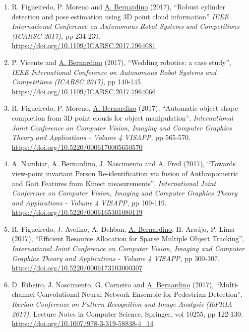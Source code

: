 \documentclass[
]{article}
\begin{document}
\begin{enumerate}
  C. Cardoso and \ul{A. Bernardino} (2017), ``Adaptive Non-Maximal
  Suppression Filtering for Online Exploration Learning with
  Cost-Regularized Kernel Regression'', \emph{IEEE International
  Conference on Autonomous Robot Systems and Competitions (ICARSC
  2017),} pp 272-277\emph{.}
  \url{https://doi.org/10.1109/ICARSC.2017.7964087}~
\item
  R. Figueiredo, P. Moreno and \ul{A. Bernardino} (2017), ``Robust
  cylinder detection and pose estimation using 3D point cloud
  information'' \emph{IEEE International Conference on Autonomous Robot
  Systems and Competitions (ICARSC 2017),} pp 234-239\emph{.}
  \url{https://doi.org/10.1109/ICARSC.2017.7964081}~
\item
  P. Vicente and \ul{A. Bernardino} (2017), ``Wedding robotics: a case
  study'', \emph{IEEE International Conference on Autonomous Robot
  Systems and Competitions (ICARSC 2017),} pp 140-145\emph{.}
  \url{https://doi.org/10.1109/ICARSC.2017.7964066}~
\item
  R. Figueiredo, P. Moreno, \ul{A. Bernardino} (2017), ``Automatic
  object shape completion from 3D point clouds for object
  manipulation'', \emph{International Joint Conference on Computer
  Vision, Imaging and Computer Graphics Theory and Applications - Volume
  4 VISAPP,} pp 565-570. \url{https://doi.org/10.5220/0006170005650570}~
\item
  A. Nambiar, \ul{A. Bernardino}, J. Nascimento and A. Fred (2017),
  ``Towards view-point invariant Person Re-identification via fusion of
  Anthropometric and Gait Features from Kinect measurements'',
  \emph{International Joint Conference on Computer Vision, Imaging and
  Computer Graphics Theory and Applications - Volume 4 VISAPP}, pp
  109-119. \url{https://doi.org/10.5220/0006165301080119}~
\item
  R. Figueiredo, J. Avelino, A. Dehban, \ul{A. Bernardino}, H. Araújo,
  P. Lima (2017), ``Efficient Resource Allocation for Sparse Multiple
  Object Tracking'', \emph{International Joint Conference on Computer
  Vision, Imaging and Computer Graphics Theory and Applications - Volume
  4 VISAPP,} pp 300-307. \url{https://doi.org/10.5220/0006173103000307}~
\item
  D. Ribeiro, J. Nascimento, G. Carneiro and \ul{A. Bernardino} (2017),
  ``Multi-channel Convolutional Neural Network Ensemble for Pedestrian
  Detection'', \emph{Iberian Conference on Pattern Recognition and Image
  Analysis (IbPRIA 2017),} Lecture Notes in Computer Science, Springer,
  vol 10255, pp 122-130.
  \url{https://doi.org/10.1007/978-3-319-58838-4_14}~

\end{enumerate}
\end{document}
